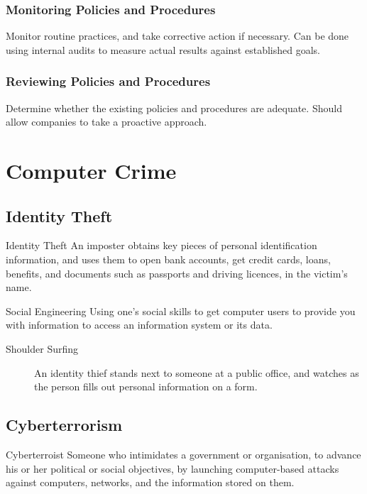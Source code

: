 \documentclass[\main/notes.tex]{subfiles}
\begin{document}
				\subsubsection{Monitoring Policies and Procedures}
					Monitor routine practices, and take corrective action if necessary. Can be done using internal audits to measure actual results against established goals.
				\subsubsection{Reviewing Policies and Procedures}
					Determine whether the existing policies and procedures are adequate. Should allow companies to take a proactive approach.

		\section{Computer Crime}
			\subsection{Identity Theft}
				\begin{definition}{Identity Theft}
					An imposter obtains key pieces of personal identification information, and uses them to open bank accounts, get credit cards, loans, benefits, and documents such as passports and driving licences, in the victim's name.
				\end{definition}
				\begin{definition}{Social Engineering}
					Using one's social skills to get computer users to provide you with information to access an information system or its data.
					\begin{description}
						\item[Shoulder Surfing] An identity thief stands next to someone at a public office, and watches as the person fills out personal information on a form.
					\end{description}
				\end{definition}
			\subsection{Cyberterrorism}
				\begin{definition}{Cyberterroist}
					Someone who intimidates a government or organisation, to advance his or her political or social objectives, by launching computer-based attacks against computers, networks, and the information stored on them.
				\end{definition}
\end{document}
